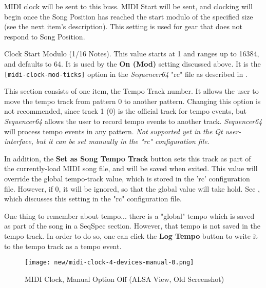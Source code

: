    MIDI clock will be sent to this buss.
   MIDI Start will be sent, and clocking will begin
   once the Song Position has reached the start modulo of the specified size
   (see the next item's description).
   This setting is used for gear that does not respond to Song Position.

   Clock Start Modulo (1/16 Notes).
   This value starts at 1 and ranges up to 16384, and defaults to 64.
   It is used by the \textbf{On (Mod)} setting discussed above.
   It is the \texttt{[midi-clock-mod-ticks]} option in the \textsl{Sequencer64}
   "rc" file as described in
   .

   This section consists of one item, the Tempo Track number.
   It allows the user to move the tempo track from pattern 0 to
   another pattern.  Changing this option is not recommended, since track 1 (0)
   is the official track for tempo events, but \textsl{Sequencer64} allows the
   user to record tempo events to another track.  \textsl{Sequencer64} will
   process tempo events in any pattern.
   \textsl{Not supported yet in the Qt user-interface, but
   it can be set manually in the "rc" configuration file.}

   In addition, the \textbf{Set as Song Tempo Track} button sets this
   track as part of the currently-load MIDI song file, and will be saved when
   exited.  This value will override the global tempo-track value, which is
   stored in the 'rc' configuration file.  However, if 0, it will be ignored,
   so that the global value will take hold.
   See , which discusses this
   setting in the "rc" configuration file.

   One thing to remember about tempo...
   there is a "global" tempo which is saved as part of the song in a SeqSpec
   section.  However, that tempo is not saved in the tempo track.
   In order to do so, one can click the \textbf{Log Tempo} button to write it
   to the tempo track as a tempo event.

\begin{figure}[H]
   \centering 
   \texttt{[image: new/midi-clock-4-devices-manual-0.png]}
   \caption{MIDI Clock, Manual Option Off (ALSA View, Old Screenshot)}
   \label{fig:seq64_midi_clock_4_devices_manual_0}
\end{figure}

